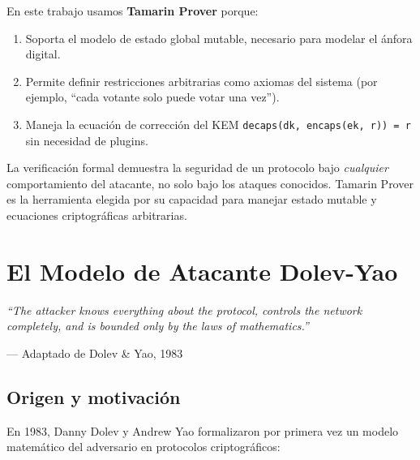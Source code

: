 \documentclass[12pt, a4paper, twoside, openright]{book}
\begin{document}
\medskip

En este trabajo usamos \textbf{Tamarin Prover} porque:
\begin{enumerate}[itemsep=2pt]
  \item Soporta el modelo de estado global mutable, necesario para
    modelar el \'anfora digital.
  \item Permite definir restricciones arbitrarias como axiomas del
    sistema (por ejemplo, ``cada votante solo puede votar una vez'').
  \item Maneja la ecuaci\'on de correcci\'on del KEM
    \texttt{decaps(dk, encaps(ek, r)) = r} sin necesidad de plugins.
\end{enumerate}

\begin{cajaResumen}
  La verificaci\'on formal demuestra la seguridad de un protocolo
  bajo \emph{cualquier} comportamiento del atacante, no solo bajo
  los ataques conocidos. Tamarin Prover es la herramienta elegida
  por su capacidad para manejar estado mutable y ecuaciones
  criptogr\'aficas arbitrarias.
\end{cajaResumen}

\chapter{El Modelo de Atacante Dolev-Yao}

\epigraph{%
  \textit{``The attacker knows everything about the protocol, controls
  the network completely, and is bounded only by the laws of
  mathematics.''}
}{--- Adaptado de Dolev \& Yao, 1983}

\section{Origen y motivaci\'on}

En 1983, Danny Dolev y Andrew Yao formalizaron por primera vez un
modelo matem\'atico del adversario en protocolos criptogr\'aficos:
\end{document}
